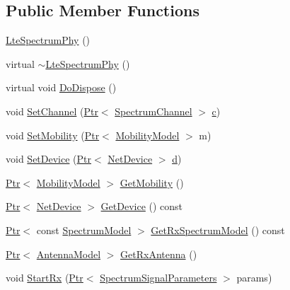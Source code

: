 \subsection*{Public Member Functions}
\begin{DoxyCompactItemize}
\item 
\hyperlink{classns3_1_1LteSpectrumPhy_a689d4909a1da1d10727e382ad8b04a91}{Lte\+Spectrum\+Phy} ()
\item 
virtual \hyperlink{classns3_1_1LteSpectrumPhy_aa324e09bcad0a0eccd6c7db4afa6fe62}{$\sim$\+Lte\+Spectrum\+Phy} ()
\item 
virtual void \hyperlink{classns3_1_1LteSpectrumPhy_a241ca823c6f5999f301d7b65d329b003}{Do\+Dispose} ()
\item 
void \hyperlink{classns3_1_1LteSpectrumPhy_a07d966727cd700c1987f52b9ecf804af}{Set\+Channel} (\hyperlink{classns3_1_1Ptr}{Ptr}$<$ \hyperlink{classns3_1_1SpectrumChannel}{Spectrum\+Channel} $>$ \hyperlink{mmwave_2model_2fading-traces_2fading__trace__generator_8m_ae0323a9039add2978bf5b49550572c7c}{c})
\item 
void \hyperlink{classns3_1_1LteSpectrumPhy_a99e5a796d9f0ca7af6e7de53040e9d89}{Set\+Mobility} (\hyperlink{classns3_1_1Ptr}{Ptr}$<$ \hyperlink{classns3_1_1MobilityModel}{Mobility\+Model} $>$ m)
\item 
void \hyperlink{classns3_1_1LteSpectrumPhy_ab420bc60aed77305ff14b5dd21de09c1}{Set\+Device} (\hyperlink{classns3_1_1Ptr}{Ptr}$<$ \hyperlink{classns3_1_1NetDevice}{Net\+Device} $>$ \hyperlink{lte__pathloss_8m_a1aabac6d068eef6a7bad3fdf50a05cc8}{d})
\item 
\hyperlink{classns3_1_1Ptr}{Ptr}$<$ \hyperlink{classns3_1_1MobilityModel}{Mobility\+Model} $>$ \hyperlink{classns3_1_1LteSpectrumPhy_a30dc4e2f85864318609e19136fe919ea}{Get\+Mobility} ()
\item 
\hyperlink{classns3_1_1Ptr}{Ptr}$<$ \hyperlink{classns3_1_1NetDevice}{Net\+Device} $>$ \hyperlink{classns3_1_1LteSpectrumPhy_ab0d3bb385e03aaf5652f710ee12d783a}{Get\+Device} () const 
\item 
\hyperlink{classns3_1_1Ptr}{Ptr}$<$ const \hyperlink{classns3_1_1SpectrumModel}{Spectrum\+Model} $>$ \hyperlink{classns3_1_1LteSpectrumPhy_a66f819b6d28822d4bcbdea1f1f9c4102}{Get\+Rx\+Spectrum\+Model} () const 
\item 
\hyperlink{classns3_1_1Ptr}{Ptr}$<$ \hyperlink{classns3_1_1AntennaModel}{Antenna\+Model} $>$ \hyperlink{classns3_1_1LteSpectrumPhy_ad8eefec5667a6be5ae22bdd04da8a8a9}{Get\+Rx\+Antenna} ()
\item 
void \hyperlink{classns3_1_1LteSpectrumPhy_af4041e1ab1f466d1c66b8f2f1c519657}{Start\+Rx} (\hyperlink{classns3_1_1Ptr}{Ptr}$<$ \hyperlink{structns3_1_1SpectrumSignalParameters}{Spectrum\+Signal\+Parameters} $>$ params)

\end{DoxyCompactItemize}
